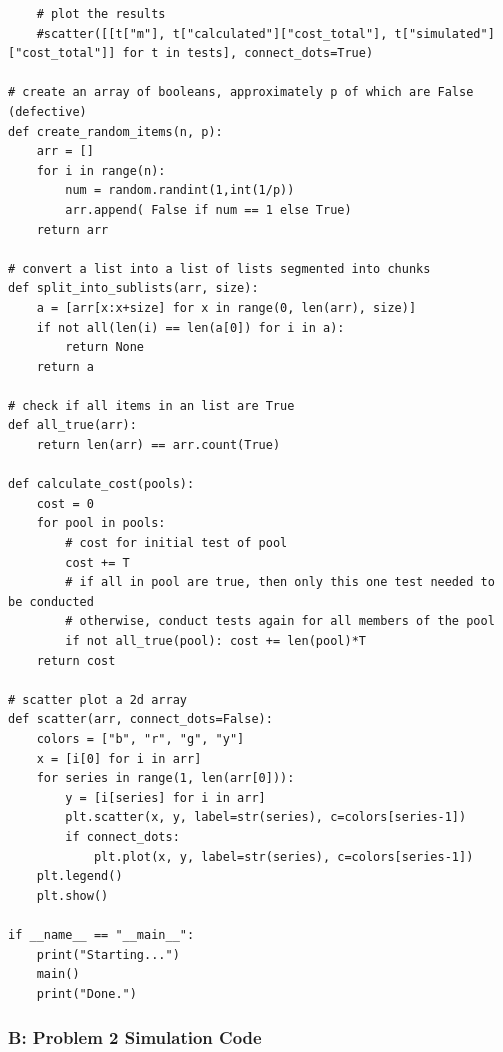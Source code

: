 \documentclass[11pt]{extarticle}
\begin{document}
\begin{verbatim}
    # plot the results
    #scatter([[t["m"], t["calculated"]["cost_total"], t["simulated"]["cost_total"]] for t in tests], connect_dots=True)

# create an array of booleans, approximately p of which are False (defective) 
def create_random_items(n, p):
    arr = []
    for i in range(n):
        num = random.randint(1,int(1/p))
        arr.append( False if num == 1 else True)
    return arr 

# convert a list into a list of lists segmented into chunks 
def split_into_sublists(arr, size):
    a = [arr[x:x+size] for x in range(0, len(arr), size)]
    if not all(len(i) == len(a[0]) for i in a):
        return None 
    return a  

# check if all items in an list are True
def all_true(arr):
    return len(arr) == arr.count(True)

def calculate_cost(pools):
    cost = 0
    for pool in pools:
        # cost for initial test of pool
        cost += T
        # if all in pool are true, then only this one test needed to be conducted
        # otherwise, conduct tests again for all members of the pool
        if not all_true(pool): cost += len(pool)*T
    return cost 

# scatter plot a 2d array
def scatter(arr, connect_dots=False):
    colors = ["b", "r", "g", "y"]
    x = [i[0] for i in arr]
    for series in range(1, len(arr[0])):
        y = [i[series] for i in arr]
        plt.scatter(x, y, label=str(series), c=colors[series-1])
        if connect_dots: 
            plt.plot(x, y, label=str(series), c=colors[series-1])
    plt.legend()
    plt.show()

if __name__ == "__main__":
    print("Starting...")
    main()
    print("Done.")

\end{verbatim}
\normalsize

\subsubsection*{B: Problem 2 Simulation Code}
\end{document}
